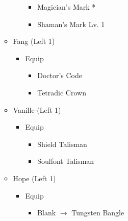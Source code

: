\begin{menu}
\begin{itemize}
\begin{itemize}
\begin{itemize}
            \begin{itemize}
                \item Magician's Mark *
                \item Shaman's Mark Lv. 1
            \end{itemize}
        \end{itemize}
        \item Fang (Left 1)
        \begin{itemize}
            \item Equip
            \begin{itemize}
                \item Doctor's Code
                \item Tetradic Crown
            \end{itemize}
        \end{itemize}
        \item Vanille (Left 1)
        \begin{itemize}
            \item Equip
            \begin{itemize}
                \item Shield Talisman
                \item Soulfont Talisman
            \end{itemize}
        \end{itemize}
        \item Hope (Left 1)
        \begin{itemize}
            \item Equip
            \begin{itemize}
                \item Blank $\rightarrow$ Tungsten Bangle
            \end{itemize}
        \end{itemize}
    \end{itemize}
\end{itemize}
\end{menu}


